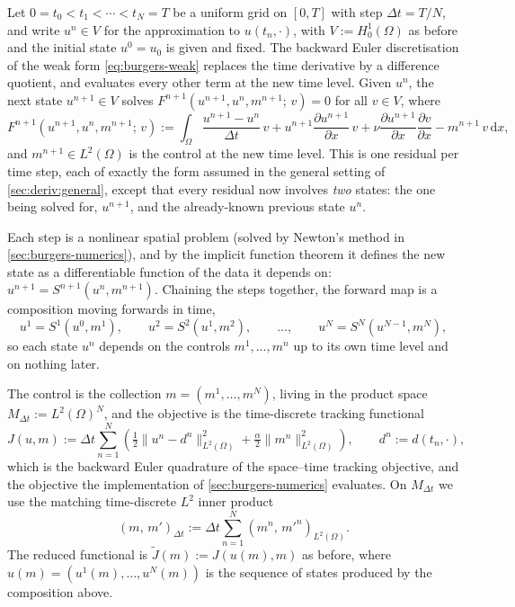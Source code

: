 \documentclass[a4paper,11pt]{article}
\newcommand{\Om}{\Omega}
\newcommand{\Lp}[1]{L^{2}(#1)}              %
\newcommand{\inner}[3]{(#1,\,#2)_{#3}}        %
\newcommand{\dx}{\,\mathrm{d}x}
\newcommand{\Jt}{\tilde{J}}                  %
\newcommand{\Mspace}{M}
\theoremstyle{spacedplain} \newtheorem{theorem}[counter]{Theorem} \newtheorem{lemma}[counter]{Lemma} \newtheorem{prop}[counter]{Proposition} \newtheorem{cor}[counter]{Corollary}
\theoremstyle{spaceddefinition} \newtheorem{defn}[counter]{Definition} \newtheorem{example}[counter]{Example} \newtheorem{remark}[counter]{Remark}
\begin{document}
Let $0 = t_0 < t_1 < \cdots < t_N = T$ be a uniform grid on $[0, T]$ with step $\Delta t = T / N$, and write $u^n \in V$ for the approximation to $u(t_n, \cdot)$, with $V := H_0^1(\Om)$ as before and the initial state $u^0 = u_0$ is given and fixed. The backward Euler discretisation of the weak form \cref{eq:burgers-weak} replaces the time derivative by a difference quotient, and evaluates every other term at the new time level. Given $u^n$, the next state $u^{n+1} \in V$ solves $F^{n+1}(u^{n+1}, u^n, m^{n+1};\, v) = 0$ for all $v \in V$, where
\begin{equation}
  \label{eq:burgers-step}
  F^{n+1}(u^{n+1}, u^n, m^{n+1};\, v)
  := \int_{\Om}
     \frac{u^{n+1} - u^n}{\Delta t}\, v
     + u^{n+1} \frac{\partial u^{n+1}}{\partial x}\, v
     + \nu \frac{\partial u^{n+1}}{\partial x} \frac{\partial v}{\partial x}
     - m^{n+1}\, v
     \dx,
\end{equation}
and $m^{n+1} \in \Lp{\Om}$ is the control at the new time level. This is one residual per time step, each of exactly the form assumed in the general setting of \cref{sec:deriv:general}, except that every residual now involves \emph{two} states: the one being solved for, $u^{n+1}$, and the already-known previous state $u^n$.

Each step is a nonlinear spatial problem (solved by Newton's method in \cref{sec:burgers-numerics}), and by the implicit function theorem it defines the new state as a differentiable function of the data it depends on: $u^{n+1} = S^{n+1}(u^n, m^{n+1})$. Chaining the steps together, the forward map is a composition moving forwards in time,
\begin{equation}
  u^1 = S^1(u^0, m^1), \qquad
  u^2 = S^2(u^1, m^2), \qquad \ldots, \qquad
  u^N = S^N(u^{N-1}, m^N),
\end{equation}
so each state $u^n$ depends on the controls $m^1, \ldots, m^n$ up to its own time level and on nothing later.

The control is the collection $m = (m^1, \ldots, m^N)$, living in the product space $\Mspace_{\Delta t} := \Lp{\Om}^N$, and the objective is the time-discrete tracking functional
\begin{equation}
  \label{eq:burgers-objective}
  J(u, m)
  := \Delta t \sum_{n=1}^{N}
     \left(
       \tfrac{1}{2} \|u^n - d^n\|_{\Lp{\Om}}^2
       + \tfrac{\alpha}{2} \|m^n\|_{\Lp{\Om}}^2
     \right),
  \qquad d^n := d(t_n, \cdot),
\end{equation}
which is the backward Euler quadrature of the space--time tracking objective, and the objective the implementation of \cref{sec:burgers-numerics} evaluates. On $\Mspace_{\Delta t}$ we use the matching time-discrete $L^2$ inner product
\begin{equation}
  \label{eq:burgers-control-ip}
  \inner{m}{m'}{\Delta t}
  := \Delta t \sum_{n=1}^{N} \inner{m^n}{m'^n}{\Lp{\Om}}.
\end{equation}
The reduced functional is $\Jt(m) := J(u(m), m)$ as before, where $u(m) = (u^1(m), \ldots, u^N(m))$ is the sequence of states produced by the composition above.
\end{document}
